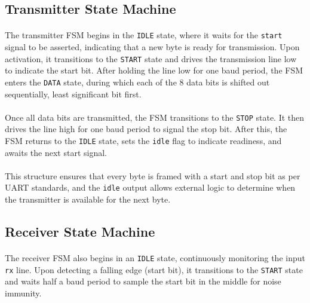 \documentclass[12pt]{report}
\begin{document}
\subsection*{Transmitter State Machine}

\paragraph{}
The transmitter FSM begins in the \texttt{IDLE} state, where it waits for the \texttt{start} signal to be asserted, indicating that a new byte is ready for transmission. Upon activation, it transitions to the \texttt{START} state and drives the transmission line low to indicate the start bit. After holding the line low for one baud period, the FSM enters the \texttt{DATA} state, during which each of the 8 data bits is shifted out sequentially, least significant bit first.

\paragraph{}
Once all data bits are transmitted, the FSM transitions to the \texttt{STOP} state. It then drives the line high for one baud period to signal the stop bit. After this, the FSM returns to the \texttt{IDLE} state, sets the \texttt{idle} flag to indicate readiness, and awaits the next start signal.

\paragraph{}
This structure ensures that every byte is framed with a start and stop bit as per UART standards, and the \texttt{idle} output allows external logic to determine when the transmitter is available for the next byte.

\subsection{Receiver State Machine}

\paragraph{}
The receiver FSM also begins in an \texttt{IDLE} state, continuously monitoring the input \texttt{rx} line. Upon detecting a falling edge (start bit), it transitions to the \texttt{START} state and waits half a baud period to sample the start bit in the middle for noise immunity.
\end{document}
